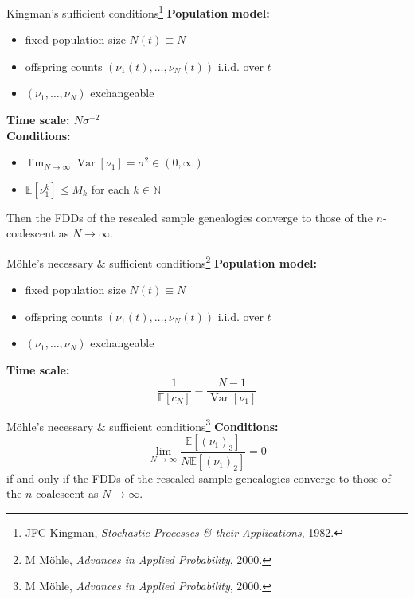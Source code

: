 \documentclass[aspectratio=169,fleqn]{beamer}
\theoremstyle{definition}
\newcommand{\E}{\mathbb{E}}
\newcommand{\V}{\operatorname{Var}}
\begin{document}
\begin{frame}{Kingman's sufficient conditions\footnote[frame]{JFC Kingman, \textit{Stochastic Processes \& their Applications}, 1982.}}
    \textbf{Population model:}
	\begin{itemize}
	\item fixed population size $N(t) \equiv N$
	\item offspring counts $(\nu_1(t), \dots, \nu_N(t))$ i.i.d. over $t$
	\item $(\nu_1, \dots, \nu_N)$ exchangeable
	\end{itemize}
	\textbf{Time scale: $N\sigma^{-2}$} \\
	\textbf{Conditions:}
	\begin{itemize}
	\item $\lim_{N\to\infty} \V[\nu_1] = \sigma^2 \in (0,\infty)$
	\item $\E[\nu_1^k] \leq M_k$ for each $k\in\mathbb{N}$
	\end{itemize}
	Then the FDDs of the rescaled sample genealogies converge to those of the $n$-coalescent as $N\to\infty$.
\end{frame}


\begin{frame}{M\"ohle's necessary \& sufficient conditions\footnote[frame]{M M\"ohle, \textit{Advances in Applied Probability}, 2000.}}
    \textbf{Population model:}
	\begin{itemize}
	\item fixed population size $N(t) \equiv N$
	\item offspring counts $(\nu_1(t), \dots, \nu_N(t))$ i.i.d. over $t$
	\item $(\nu_1, \dots, \nu_N)$ exchangeable
	\end{itemize}
	\textbf{Time scale:} 
	\begin{equation*}
	\frac{1}{\E[c_N]} = \frac{N-1}{\V[\nu_1]}
	\end{equation*}
\end{frame}
\addtocounter{footnote}{-1}
\begin{frame}{M\"ohle's necessary \& sufficient conditions\footnote[frame]{M M\"ohle, \textit{Advances in Applied Probability}, 2000.}}
	\textbf{Conditions:}
	\begin{equation*}
	\lim_{N\to\infty} \frac{\E[(\nu_1)_3]}{N\E[(\nu_1)_2]} =0 
	\end{equation*}
	if and only if the FDDs of the rescaled sample genealogies converge to those of the $n$-coalescent as $N\to\infty$.
\end{frame}
\end{document}
